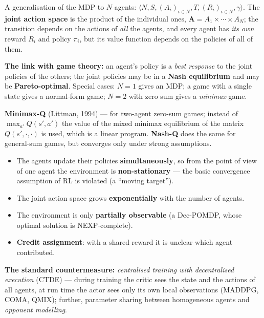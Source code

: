 \documentclass[11pt,a4paper]{article}
\theoremstyle{definition}
\providecommand{\uv}[1]{``#1''}
\begin{document}
\begin{defbox}
A generalisation of the MDP to $N$ agents:
$\langle N, S, (A_i)_{i\in N}, T, (R_i)_{i \in N}, \gamma\rangle$.
The \textbf{joint action space} is the product of the individual ones,
$\mathbf{A} = A_1 \times \cdots \times A_N$; the transition depends on the actions of
\emph{all} the agents, and every agent has \emph{its own} reward $R_i$ and policy $\pi_i$, but
its value function depends on the policies of all of them.

\textbf{The link with game theory:} an agent's policy is a \emph{best response} to the joint
policies of the others; the joint policies may be in a \textbf{Nash equilibrium} and may be
\textbf{Pareto-optimal}. Special cases: $N=1$ gives an MDP; a game with a single state gives a
normal-form game; $N=2$ with zero sum gives a \emph{minimax} game.

\textbf{Minimax-Q} (Littman, 1994) --- for two-agent zero-sum games; instead of
$\max_{a'} Q(s',a')$ the value of the mixed minimax equilibrium of the matrix
$Q(s',\cdot,\cdot)$ is used, which is a linear program. \textbf{Nash-Q} does the same for
general-sum games, but converges only under strong assumptions.
\end{defbox}

\begin{defbox}
\begin{itemize}
\item The agents update their policies \textbf{simultaneously}, so from the point of view of one
  agent the environment is \textbf{non-stationary} --- the basic convergence assumption of RL is
  violated (a \uv{moving target}).
\item The joint action space grows \textbf{exponentially} with the number of agents.
\item The environment is only \textbf{partially observable} (a Dec-POMDP, whose optimal solution
  is NEXP-complete).
\item \textbf{Credit assignment}: with a shared reward it is unclear which agent contributed.
\end{itemize}
\textbf{The standard countermeasure:} \emph{centralised training with decentralised execution}
(CTDE) --- during training the critic sees the state and the actions of all agents, at run time
the actor sees only its own local observations (MADDPG, COMA, QMIX); further, parameter sharing
between homogeneous agents and \emph{opponent modelling}.
\end{defbox}
\end{document}
